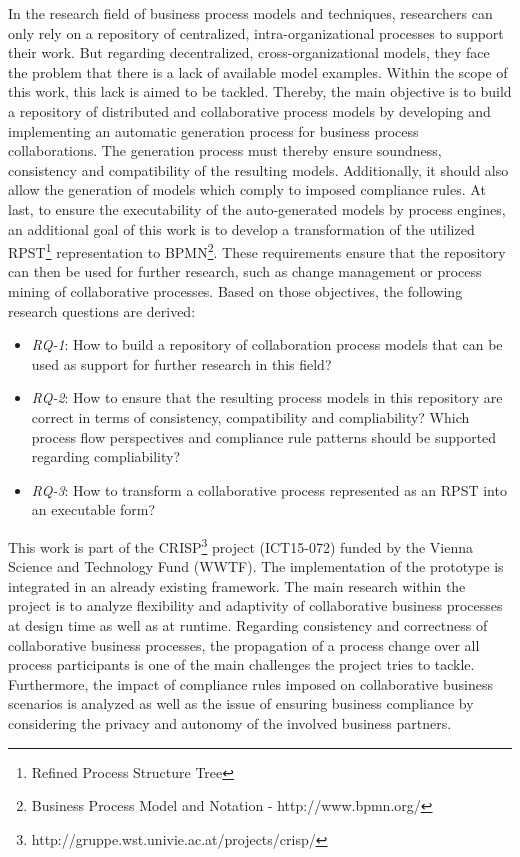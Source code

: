 In the research field of business process models and techniques, researchers can only rely on a repository of centralized, intra-organizational processes to support their work. But regarding decentralized, cross-organizational models, they face the problem that there is a lack of available model examples. Within the scope of this work, this lack is aimed to be tackled. Thereby, the main objective is to build a repository of distributed and collaborative process models by developing and implementing an automatic generation process for business process collaborations. The generation process must thereby ensure soundness, consistency and compatibility of the resulting models. Additionally, it should also allow the generation of models which comply to imposed compliance rules. At last, to ensure the executability of the auto-generated models by process engines, an additional goal of this work is to develop a transformation of the utilized RPST\footnote{Refined Process Structure Tree } representation to BPMN\footnote{Business Process Model and Notation - http://www.bpmn.org/}. These requirements ensure that the repository can then be used for further research, such as change management or process mining of collaborative processes. Based on those objectives, the following research questions are derived:

\begin{itemize}
\item \textit{RQ-1}: How to build a repository of collaboration process models that can be used as support for further research in this field?
\item \textit{RQ-2}: How to ensure that the resulting process models in this repository are correct in terms of consistency, compatibility and compliability? Which process flow perspectives and compliance rule patterns should be supported regarding compliability? 
\item \textit{RQ-3}: How to transform a collaborative process represented as an RPST into an executable form?
\end{itemize}

This work is part of the CRISP\footnote{http://gruppe.wst.univie.ac.at/projects/crisp/} project (ICT15-072) funded by the Vienna Science and Technology Fund (WWTF). The implementation of the prototype is integrated in an already existing framework. The main research within the project is to analyze flexibility and adaptivity of collaborative business processes at design time as well as at runtime. Regarding consistency and correctness of collaborative business processes, the propagation of a process change over all process participants is one of the main challenges the project tries to tackle. Furthermore, the impact of compliance rules imposed on collaborative business scenarios is analyzed as well as the issue of ensuring business compliance by considering the privacy and autonomy of the involved business partners.\\


